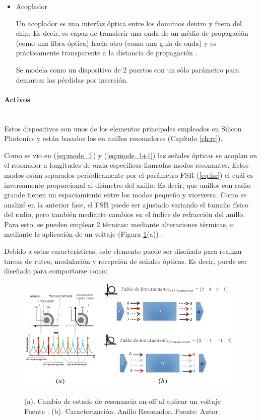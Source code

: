 \begin{itemize}
\item Acoplador

Un acoplador es una interfaz óptica entre los dominios dentro y fuera del chip. 
Es decir, es capaz de transferir una onda de un médio de propagación (como una
fibra óptica) hacia otro (como una guía de onda) y es prácticamente transparente
a la distancia de propagación \cite{Chan2011}.

Se modela como un dispositivo de 2 puertos con un sólo parámetro para demarcar
las pérdidas por inserción.

\end{itemize}

\paragraph{Activos}~\\

Estos dispositivos son unos de los elementos principales
empleados en Silicon Photonics y están basados los en anillos 
resonadores (Capítulo \ref{ch:rr}).

Como se vio en (\ref{eq:mode_l}) y (\ref{eq:mode_l+1}) las señales ópticas se acoplan
en el resonador a longitudes de onda específicas llamadas modos resonantes. 
Estos modos están separados periódicamente por el parámetro FSR (\ref{eq:fsr}) 
el cuál es inversamente proporcional al diámetro del anillo. Es decir, que anillos
con radio grande tienen un espaciamiento entre los modos pequeño y viceversa.
Como se analizó en la anterior fase, el FSR puede ser ajustado variando
el tamaño físico del radio, pero también mediante cambios en el índice de refracción
del anillo. Para esto, se pueden emplear 2 técnicas: mediante alteraciones térmicas,
o mediante la aplicación de un voltaje (Figura \ref{fig:phoenix_wgc}(a)) \cite{Chan2010}.

Debido a estas características, este elemento puede ser diseñado para realizar 
tareas de ruteo, modulación y recepción de señales ópticas. Es decir, puede ser
diseñado para comportarse como:

\begin{figure}[H]
\caption{(a). Cambio de estado de resonancia on-off
al aplicar un voltaje Fuente \cite{hendry2011time}. (b). Caracterización: Anillo Resonador. Fuente: Autor.}
\centering
\includegraphics[width=1.0\textwidth,natwidth=800,natheight=390]{figs/rr.png}
\label{fig:phoenix_wgc}
\end{figure}

